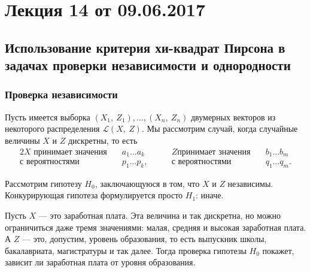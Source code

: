 \section{Лекция 14 от 09.06.2017}
\subsection{Использование критерия хи-квадрат Пирсона в задачах проверки 
независимости и однородности}
\subsubsection{Проверка независимости}
Пусть имеется выборка $(X_1,\ Z_1), \ldots, (X_n,\ Z_n)$ двумерных
векторов из некоторого распределения $\mathcal{L}(X,\ Z)$. Мы рассмотрим
случай, когда случайные величины $X$ и $Z$ дискретны, то есть
\begin{alignat}{2}
    \text{$X$ принимает значения} & \quad a_1 \ldots a_k & \qquad \text{$Z$
    принимает значения} & \quad b_1 \ldots b_m \\
    \text{с вероятностями} & \quad p_1 \ldots p_k, & \qquad \text{с
    вероятностями} & \quad q_1 \ldots q_m.
\end{alignat}

Рассмотрим гипотезу $H_0$, заключающуюся в том, что $X$ и $Z$ независимы.
Конкурирующая гипотеза формулируется просто $H_1$: иначе.

\begin{example}
    Пусть $X$ --- это заработная плата. Эта величина и так дискретна, но
    можно ограничиться даже тремя значениями: малая, средняя и высокая
    заработная плата. А $Z$ --- это, допустим, уровень образования, то
    есть выпускник школы, бакалавриата, магистратуры и так далее. Тогда
    проверка гипотезы $H_0$ покажет, зависит ли заработная плата от
    уровня образования.
\end{example}

